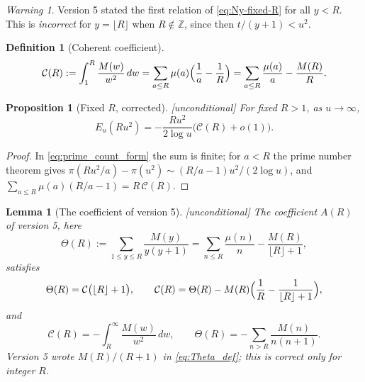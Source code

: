 \documentclass[11pt]{amsart}
\numberwithin{equation}{section}
\theoremstyle{plain}
\newtheorem{proposition}[theorem]{Proposition}
\newtheorem{lemma}[theorem]{Lemma}
\theoremstyle{definition}
\newtheorem{definition}[theorem]{Definition}
\theoremstyle{remark}
\newtheorem{warning}[theorem]{Warning}
\newcommand{\Cc}{\mathcal{C}}
\begin{document}
\begin{warning}
\label{warn:v5_Ny}
Version 5 stated the first relation of \eqref{eq:Ny-fixed-R} for all $y<R$.
This is \emph{incorrect} for $y=\lfloor R\rfloor$ when $R\notin\mathbb{Z}$,
since then $t/(y+1)<u^2$.
\end{warning}

\begin{definition}[Coherent coefficient]
\label{def:coherent_coefficient}
\begin{equation}
\label{eq:C_def}
  \Cc(R):=\int_1^R\frac{M(w)}{w^2}\,dw
  =\sum_{a\le R}\mu(a)\Bigl(\frac1a-\frac1R\Bigr)
  =\sum_{a\le R}\frac{\mu(a)}a-\frac{M(R)}R .
\end{equation}
\end{definition}

\begin{proposition}[Fixed $R$, corrected]
\label{prop:fixed_R_corrected}
\emph{[unconditional]} For fixed $R>1$, as $u\to\infty$,
\begin{equation}
\label{eq:E_fixed_R}
  E_u(Ru^2)=-\frac{Ru^2}{2\log u}\bigl(\Cc(R)+o(1)\bigr).
\end{equation}
\end{proposition}

\begin{proof}
In \eqref{eq:prime_count_form} the sum is finite; for $a<R$ the prime number
theorem gives $\pi(Ru^2/a)-\pi(u^2)\sim(R/a-1)u^2/(2\log u)$, and
$\sum_{a\le R}\mu(a)(R/a-1)=R\,\Cc(R)$.
\end{proof}

\begin{lemma}[The coefficient of version 5]
\label{lem:copy-weight-coefficient}
\emph{[unconditional]} The coefficient $A(R)$ of version 5, here
\begin{equation}
\label{eq:Theta_def}
  \Theta(R):=\sum_{1\le y\le R}\frac{M(y)}{y(y+1)}
  =\sum_{n\le R}\frac{\mu(n)}n-\frac{M(R)}{\lfloor R\rfloor+1},
\end{equation}
satisfies
\begin{equation}
\label{eq:Theta_C}
  \Theta(R)=\Cc\bigl(\lfloor R\rfloor+1\bigr),\qquad
  \Cc(R)=\Theta(R)-M(R)\Bigl(\frac1R-\frac1{\lfloor R\rfloor+1}\Bigr),
\end{equation}
and
\begin{equation}
\label{eq:C_tail}
  \Cc(R)=-\int_R^\infty\frac{M(w)}{w^2}\,dw,\qquad
  \Theta(R)=-\sum_{n>R}\frac{M(n)}{n(n+1)}.
\end{equation}
Version 5 wrote $M(R)/(R+1)$ in \eqref{eq:Theta_def}; this is correct only
for integer $R$.
\end{lemma}
\end{document}
